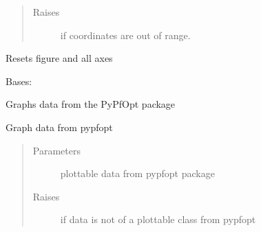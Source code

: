 \documentclass[letterpaper,10pt,english]{sphinxmanual}
\begin{document}
\begin{fulllineitems}
\begin{fulllineitems}
\begin{quote}
\begin{description}
\item[{Raises}] \leavevmode
{} \textendash{} if coordinates are out of range.

\end{description}\end{quote}

\end{fulllineitems}


\begin{fulllineitems}
\label{\detokenize{dalio.external:dalio.external.PySubplotGraph.reset}}
Resets figure and all axes

\end{fulllineitems}


\end{fulllineitems}


\begin{fulllineitems}
\label{\detokenize{dalio.external:dalio.external.PyPfOptGraph}}
Bases: {\hyperref[\detokenize{dalio.external:dalio.external.image.PyPlotGraph}]{}}

Graphs data from the PyPfOpt package

\begin{fulllineitems}
\label{\detokenize{dalio.external:dalio.external.PyPfOptGraph.plot}}
Graph data from pypfopt
\begin{quote}\begin{description}
\item[{Parameters}] \leavevmode
{} \textendash{} plottable data from pypfopt package

\item[{Raises}] \leavevmode
{} \textendash{} if data is not of a plottable class from pypfopt

\end{description}\end{quote}

\end{fulllineitems}


\end{fulllineitems}
\end{document}
